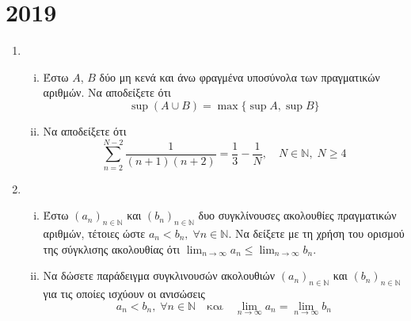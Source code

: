 


\thispagestyle{empty}



\begin{center}
  \minibox{\large \bfseries \textcolor{Col1}{Θέματα Απειροστικός Ι}}
\end{center}

\vspace{\baselineskip}

\section*{2019}

\begin{enumerate}
    \item 
        \begin{enumerate}[i)]
            \item Έστω $A$, $B$ δύο μη κενά και άνω φραγμένα υποσύνολα των 
                πραγματικών αριθμών.  Να αποδείξετε ότι 
                \[
                    \sup (A \cup B) = \max \{ \sup A, \sup B \} 
                \] 
            \item Να αποδείξετε ότι 
                \[
                    \sum_{n=2}^{N-2} \frac{1}{(n+1)(n+2)} = \frac{1}{3} - \frac{1}{N}, 
                    \quad N \in \mathbb{N}, \; N \geq 4
                \] 
        \end{enumerate}

    \item 
        \begin{enumerate}[i)]
            \item Έστω $ {(a_{n})}_{n \in \mathbb{N}} $ και 
                $ {(b_{n})}_{n \in \mathbb{N}} $ δυο συγκλίνουσες ακολουθίες 
                πραγματικών αριθμών, τέτοιες ώστε $ a_{n} < b_{n}, \; \forall n 
                \in \mathbb{N} $. Να δείξετε με τη χρήση του 
                ορισμού της σύγκλισης ακολουθίας ότι $ \lim_{n \to \infty} a_{n} 
                \leq \lim_{n \to \infty} b_{n}$.

            \item Να δώσετε παράδειγμα συγκλινουσών ακολουθιών 
                $ {(a_{n})}_{n \in \mathbb{N}} $ και
                $ {(b_{n})}_{n \in \mathbb{N}} $ για τις οποίες ισχύουν οι 
                ανισώσεις 
                \[
                    a_{n} < b_{n}, \; \forall n \in \mathbb{N} \quad \text{και} \quad 
                    \lim_{n \to \infty} a_{n} = \lim_{n \to \infty} b_{n}
                \] 
        \end{enumerate}


\end{enumerate}
